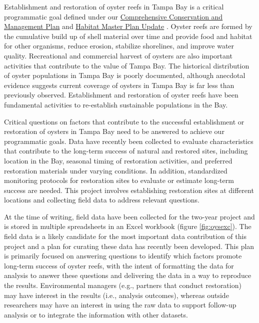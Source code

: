 \documentclass[
]{book}
\begin{document}
Establishment and restoration of oyster reefs in Tampa Bay is a critical programmatic goal defined under our \href{https://indd.adobe.com/view/cf7b3c48-d2b2-4713-921c-c2a0d4466632}{Comprehensive Conservation and Management Plan} \citep{tbep1017} and \href{https://drive.google.com/file/d/1Hp0l_qtbxp1JxKJoGatdyuANSzQrpL0I/view}{Habitat Master Plan Update} \citep{tbep0720}. Oyster reefs are formed by the cumulative build up of shell material over time and provide food and habitat for other organisms, reduce erosion, stabilize shorelines, and improve water quality. Recreational and commercial harvest of oysters are also important activities that contribute to the value of Tampa Bay. The historical distribution of oyster populations in Tampa Bay is poorly documented, although anecdotal evidence suggests current coverage of oysters in Tampa Bay is far less than previously observed. Establishment and restoration of oyster reefs have been fundamental activities to re-establish sustainable populations in the Bay.

Critical questions on factors that contribute to the successful establishment or restoration of oysters in Tampa Bay need to be answered to achieve our programmatic goals. Data have recently been collected to evaluate characteristics that contribute to the long-term success of natural and restored sites, including location in the Bay, seasonal timing of restoration activities, and preferred restoration materials under varying conditions. In addition, standardized monitoring protocols for restoration sites to evaluate or estimate long-term success are needed. This project involves establishing restoration sites at different locations and collecting field data to address relevant questions.

At the time of writing, field data have been collected for the two-year project and is stored in multiple spreadsheets in an Excel workbook (figure \ref{fig:oysexc}). The field data is a likely candidate for the most important data contribution of this project and a plan for curating these data has recently been developed. This plan is primarily focused on answering questions to identify which factors promote long-term success of oyster reefs, with the intent of formatting the data for analysis to answer these questions and delivering the data in a way to reproduce the results. Environmental managers (e.g., partners that conduct restoration) may have interest in the results (i.e., analysis outcomes), whereas outside researchers may have an interest in using the raw data to support follow-up analysis or to integrate the information with other datasets.
\end{document}

